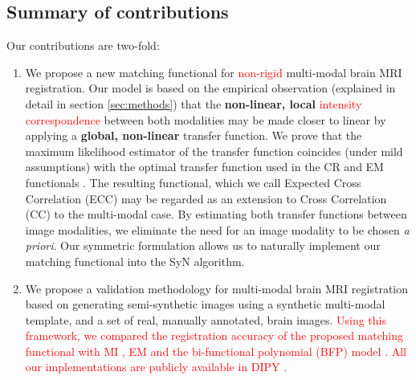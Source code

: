 \subsection{Summary of contributions}
Our contributions are two-fold:
\begin{enumerate}
\item{We propose a new matching functional for \textcolor{red}{non-rigid} multi-modal brain MRI registration. Our model is based on the empirical observation (explained in detail in section \ref{sec:methods}) that the \textbf{non-linear, local} \textcolor{red}{intensity correspondence} between both modalities may be made closer to linear by applying a \textbf{global, non-linear} transfer function. We prove that the maximum likelihood estimator of the transfer function coincides (under mild assumptions) with the optimal transfer function used in the CR and EM functionals \cite{Roche1998, Arce-santana2014, Ocegueda2015}. The resulting functional, which we call Expected Cross Correlation (ECC) may be regarded as an extension to Cross Correlation (CC) to the multi-modal case. By estimating both transfer functions between image modalities, we eliminate the need for an image modality to be chosen {\it a priori}. Our symmetric formulation allows us to naturally implement our matching functional into the SyN \cite{Avants2011a} algorithm.}
\item{We propose a validation methodology for multi-modal brain MRI registration based on generating semi-synthetic images using a synthetic multi-modal template, and a set of real, manually annotated, brain images. \textcolor{red}{ Using this framework, we compared the registration accuracy of the proposed matching functional with MI \cite{Mattes2003}, EM \cite{Arce-santana2014} and the bi-functional polynomial (BFP) model \cite{Guimond2001}. All our implementations are publicly available in DIPY \cite{Garyfallidis2014}.}}
\end{enumerate}
